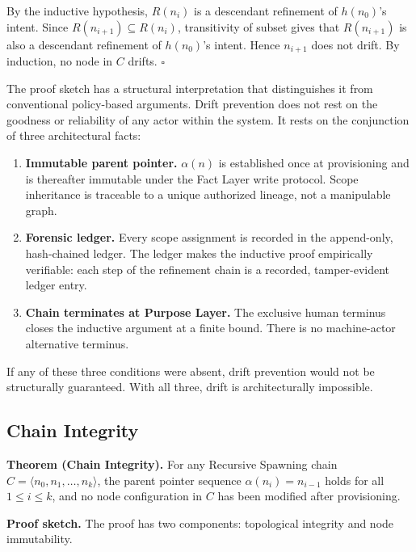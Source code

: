 By the inductive hypothesis, $R(n_i)$ is a descendant refinement of $h(n_0)$'s intent. Since $R(n_{i+1}) \subseteq R(n_i)$, transitivity of subset gives that $R(n_{i+1})$ is also a descendant refinement of $h(n_0)$'s intent. Hence $n_{i+1}$ does not drift. By induction, no node in $C$ drifts. $\square$

\medskip
The proof sketch has a structural interpretation that distinguishes it from conventional policy-based arguments. Drift prevention does not rest on the goodness or reliability of any actor within the system. It rests on the conjunction of three architectural facts:

\begin{enumerate}
    \item[(1)] \textbf{Immutable parent pointer.} $\alpha(n)$ is established once at provisioning and is thereafter immutable under the Fact Layer write protocol. Scope inheritance is traceable to a unique authorized lineage, not a manipulable graph.
    \item[(2)] \textbf{Forensic ledger.} Every scope assignment is recorded in the append-only, hash-chained ledger. The ledger makes the inductive proof empirically verifiable: each step of the refinement chain is a recorded, tamper-evident ledger entry.
    \item[(3)] \textbf{Chain terminates at Purpose Layer.} The exclusive human terminus closes the inductive argument at a finite bound. There is no machine-actor alternative terminus.
\end{enumerate}

If any of these three conditions were absent, drift prevention would not be structurally guaranteed. With all three, drift is architecturally impossible.

\subsection{Chain Integrity}
\label{sec:rs-chain-integrity}

\medskip
\noindent\textbf{Theorem (Chain Integrity).}
For any Recursive Spawning chain $C = \langle n_0, n_1, \ldots, n_k \rangle$, the parent pointer sequence $\alpha(n_i) = n_{i-1}$ holds for all $1 \leq i \leq k$, and no node configuration in $C$ has been modified after provisioning.

\medskip
\noindent\textbf{Proof sketch.}
The proof has two components: topological integrity and node immutability.

